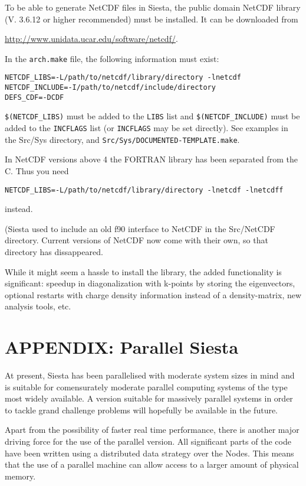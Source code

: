 \documentclass[11pt]{article}
\begin{document}
To be able to generate NetCDF files in {\sc Siesta}, the public domain
NetCDF library (V. 3.6.12 or higher recommended) must be installed. It can be
downloaded from

\url{http://www.unidata.ucar.edu/software/netcdf/}.

In the {\tt arch.make} file, the following information must exist:
\begin{verbatim}
NETCDF_LIBS=-L/path/to/netcdf/library/directory -lnetcdf
NETCDF_INCLUDE=-I/path/to/netcdf/include/directory
DEFS_CDF=-DCDF
\end{verbatim}
{\tt \$(NETCDF\_LIBS)} must be added to the {\tt LIBS} list and
{\tt \$(NETCDF\_INCLUDE)} must be added to the {\tt INCFLAGS} list (or
{\tt INCFLAGS} may be set directly). See examples in the Src/Sys
directory, and {\tt Src/Sys/DOCUMENTED-TEMPLATE.make}.

In NetCDF versions above 4 the FORTRAN library has been separated 
from the C. Thus you need
\begin{verbatim}
NETCDF_LIBS=-L/path/to/netcdf/library/directory -lnetcdf -lnetcdff
\end{verbatim}
instead.

({\sc Siesta} used to include an old f90 interface to NetCDF in the
Src/NetCDF directory. Current versions of NetCDF now come with their
own, so that directory has dissappeared.

While it might seem a hassle to install the library, the added
functionality is significant: speedup in diagonalization with k-points
by storing the eigenvectors, optional restarts with charge density
information instead of a density-matrix,  new analysis tools, etc.


\newpage
\section{APPENDIX: Parallel {\sc Siesta}}
\label{sec:parallel}

At present, {\sc Siesta} has been parallelised with moderate system sizes
in mind and is suitable for comensurately moderate parallel computing
systems of the type most widely available. A version suitable for
massively parallel systems in order to tackle grand challenge problems
will hopefully be available in the future.

Apart from the possibility of faster real time performance, there is
another major driving force for the use of the parallel version. All
significant parts of the code have been written using a distributed
data strategy over the Nodes. This means that the use of a parallel
machine can allow access to a larger amount of physical memory.
\end{document}

